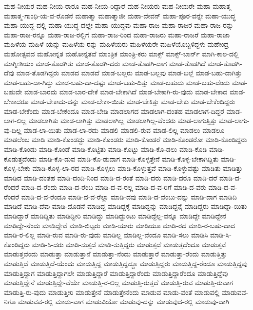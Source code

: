 {ಮಹ-ನೀಯರ
ಮಹ-ನೀಯ-ರಾರೂ
ಮಹ-ನೀಯ-ರಿದ್ದಾರೆ
ಮಹ-ನೀಯರು
ಮಹ-ನೀಯರೇ
ಮಹಾ
ಮಹಾತ್ಮ
ಮಹಾತ್ಮ-ಗಾಂಧಿ-ಯ-ವ-ರೊಡನೆ
ಮಹಾತ್ಮಾ
ಮಹಾತ್ಮಾಜೀ
ಮಹಾ-ದೇವನ್
ಮಹಾ-ಪೂರ-ವನ್ನೇ
ಮಹಾ-ಯುದ್ಧ
ಮಹಾ-ಯುದ್ಧ-ದಲ್ಲಿ
ಮಹಾ-ಯುದ್ಧ-ದಲ್ಲೇ
ಮಹಾ-ಯುದ್ಧವು
ಮಹಾ-ರಾಜ
ಮಹಾ-ರಾಜರ
ಮಹಾ-ರಾಜ-ರನ್ನು
ಮಹಾ-ರಾಜ-ರನ್ನೂ
ಮಹಾ-ರಾಜ-ರಲ್ಲಿಗೆ
ಮಹಾ-ರಾಜ-ರಿಂದ
ಮಹಾ-ರಾಜರು
ಮಹಾ-ರಾಜರೆ
ಮಹಾ-ರಾಜಾ
ಮಹಿಳೆಯ
ಮಹಿಳೆ-ಯನ್ನು
ಮಹಿಳೆಯ-ರನ್ನು
ಮಹಿಳೆಯರು
ಮಹಿಳೆಯರೇ
ಮಹಿಳೆಯೊಬ್ಬಳಿದ್ದಳು
ಮಹೇಂದ್ರ
ಮಹೋತ್ಸವದ
ಮಹೋನ್ನತ
ಮಹೋನ್ನತವೆ
ಮಾಂತ್ರಿಕ
ಮಾಂತ್ರಿ-ಕರು
ಮಾಕ್ಸ್
ಮಾಕ್ಸ್-ಬಾರ್ನ್
ಮಾಗಿ-ಕಾಲ-ದಲ್ಲಿ
ಮಾಗ್ನೀಶಿಯಂ
ಮಾಡ-ತೊಡಗಿತು
ಮಾಡ-ತೊಡಗಿ-ದರು
ಮಾಡ-ತೊಡಗಿ-ದಾಗ
ಮಾಡ-ತೊಡಗಿದೆ
ಮಾಡ-ತೊಡಗಿ-ದೆವು
ಮಾಡ-ತೊಡಗಿದ್ದರು
ಮಾಡದ
ಮಾಡದೆ
ಮಾಡ-ಬಲ್ಲರು
ಮಾಡ-ಬಲ್ಲವು
ಮಾಡ-ಬಲ್ಲೆ
ಮಾಡ-ಬಹು-ದಾಗಿತ್ತು
ಮಾಡ-ಬಹು-ದಾ-ಗಿದ್ದು
ಮಾಡ-ಬಹು-ದಾ-ದಷ್ಟು
ಮಾಡ-ಬಹು-ದಿತ್ತು
ಮಾಡ-ಬಹುದು
ಮಾಡ-ಬಹು-ದೆಂದು
ಮಾಡ-ಬಹುದೇ
ಮಾಡ-ಬಾರದು
ಮಾಡ-ಬಾರ-ದೇಕೆ
ಮಾಡ-ಬೇಕಾಗಿದೆ
ಮಾಡ-ಬೇಕಾಗಿ-ರು-ವುದು
ಮಾಡ-ಬೇಕಾದ
ಮಾಡ-ಬೇಕಾದರೂ
ಮಾಡ-ಬೇಕಾದು-ದನ್ನು
ಮಾಡ-ಬೇಕಾ-ಯಿತು
ಮಾಡ-ಬೇಕಿತ್ತು
ಮಾಡ-ಬೇಕು
ಮಾಡ-ಬೇಕೆಂದಿದ್ದರು
ಮಾಡ-ಬೇಕೆಂದು
ಮಾಡ-ಬೇಕೆಂದೂ
ಮಾಡ-ಬೇಡಿ
ಮಾಡಲಾಗದ
ಮಾಡಲಾಗ-ದಂತಹ
ಮಾಡಲಾಗ-ದಿದ್ದರೆ
ಮಾಡ-ಲಾಗ-ಲಿಲ್ಲ
ಮಾಡಲಾಗಿತು
ಮಾಡ-ಲಾಗಿತ್ತು
ಮಾಡಲಾಗಿಲ್ಲ
ಮಾಡಲಾಗಿಲ್ಲ-ವೆಂದರು
ಮಾಡ-ಲಾಗುತ್ತಿತ್ತು
ಮಾಡ-ಲಾಗು-ವು-ದಿಲ್ಲ
ಮಾಡ-ಲಾ-ಯಿತು
ಮಾಡ-ಲಾ-ರದು
ಮಾಡಲಿ
ಮಾಡಲಿ-ರುವ
ಮಾಡ-ಲಿಲ್ಲ
ಮಾಡಲು
ಮಾಡಲೂ
ಮಾಡಲೆಂಬ
ಮಾಡಿ
ಮಾಡಿ-ಕೊಂಡದ್ದು
ಮಾಡಿ-ಕೊಂಡರು
ಮಾಡಿ-ಕೊಂಡರೆ
ಮಾಡಿ-ಕೊಂಡರೋ
ಮಾಡಿ-ಕೊಂಡಿದ್ದರು
ಮಾಡಿ-ಕೊಂಡು
ಮಾಡಿ-ಕೊಂಡೆ
ಮಾಡಿ-ಕೊಟ್ಟಿತು
ಮಾಡಿ-ಕೊಟ್ಟು
ಮಾಡಿ-ಕೊ-ಡಲು
ಮಾಡಿ-ಕೊಡಿ
ಮಾಡಿ-ಕೊಡುತ್ತದೆಂದು
ಮಾಡಿ-ಕೊ-ಡುವ
ಮಾಡಿ-ಕೊ-ಡುವಾಗ
ಮಾಡಿ-ಕೊಳ್ಳತ್ತೇನೆ
ಮಾಡಿ-ಕೊಳ್ಳ-ಬೇಕಾಗಿದ್ದಿತು
ಮಾಡಿ-ಕೊಳ್ಳ-ಬೇಕು
ಮಾಡಿ-ಕೊಳ್ಳ-ಲಾ-ರದ
ಮಾಡಿ-ಕೊಳ್ಳಲು
ಮಾಡಿ-ಕೊಳ್ಳುತ್ತವೆ
ಮಾಡಿ-ಕೊಳ್ಳುವಷ್ಟು
ಮಾಡಿತು
ಮಾಡಿತ್ತು
ಮಾಡಿದ
ಮಾಡಿ-ದಂತಹ
ಮಾಡಿ-ದಂದಿ-ನಿಂದ
ಮಾಡಿ-ದ-ರಂತೆ
ಮಾಡಿ-ದರು
ಮಾಡಿ-ದರೂ
ಮಾಡಿ-ದರೆ
ಮಾಡಿ-ದ-ರೆಂದರೆ
ಮಾಡಿ-ದ-ರೆಂದು
ಮಾಡಿ-ದ-ರೆಂಬ
ಮಾಡಿ-ದ-ವ-ರಲ್ಲ
ಮಾಡಿ-ದ-ವ-ರಿಗೆ
ಮಾಡಿ-ದ-ವರು
ಮಾಡಿ-ದ-ವ-ರೆಂದರೆ
ಮಾಡಿ-ದ-ವ-ರೆಂದೂ
ಮಾಡಿ-ದ-ವ-ರೆಲ್ಲಾ
ಮಾಡಿ-ದವು
ಮಾಡಿ-ದ-ವೆಂಬು-ದನ್ನು
ಮಾಡಿ-ದಾಗ
ಮಾಡಿದಿ
ಮಾಡಿದೆ
ಮಾಡಿ-ದೆವು
ಮಾಡಿ-ದೊಡನೆ
ಮಾಡಿದ್ದ
ಮಾಡಿದ್ದಕ್ಕೆ
ಮಾಡಿದ್ದನ್ನು
ಮಾಡಿದ್ದನ್ನೆ
ಮಾಡಿದ್ದರು
ಮಾಡಿದ್ದಾ-ಯಿತು
ಮಾಡಿದ್ದಾರೆ
ಮಾಡಿದ್ದಿತು
ಮಾಡಿದ್ದೀರಿ
ಮಾಡಿದ್ದು
ಮಾಡಿದ್ದುಂಟು
ಮಾಡಿದ್ದೆಲ್ಲ-ವನ್ನೂ
ಮಾಡಿದ್ದೇ
ಮಾಡಿದ್ದೇನೆ
ಮಾಡಿದ್ದೇ-ನೆಂದು
ಮಾಡಿದ್ದೇವೆ
ಮಾಡಿ-ಬಿಟ್ಟರು
ಮಾಡಿ-ಯಾರು
ಮಾಡಿಯೂ
ಮಾಡಿ-ರದ
ಮಾಡಿ-ರ-ಬಹು-ದಾದ
ಮಾಡಿ-ರ-ಲಿಲ್ಲ
ಮಾಡಿ-ರುವ
ಮಾಡಿ-ರು-ವುದು
ಮಾಡಿಲ್ಲ
ಮಾಡಿಲ್ಲ-ವೆಂದೂ
ಮಾಡಿ-ಸಲು
ಮಾಡಿಸಿ
ಮಾಡಿ-ಸಿ-ಕೊಂಡಿದ್ದರು
ಮಾಡಿ-ಸಿ-ದರು
ಮಾಡಿ-ಸುತ್ತದೆ
ಮಾಡಿ-ಸುತ್ತಿದ್ದರು
ಮಾಡುತ್ತದೆ
ಮಾಡುತ್ತದೆಂದೂ
ಮಾಡುತ್ತವೆ
ಮಾಡುತ್ತವೆಂದು
ಮಾಡುತ್ತಾ
ಮಾಡುತ್ತಾನೆ
ಮಾಡುತ್ತಾ-ನೆಂದು
ಮಾಡುತ್ತಾರೆ
ಮಾಡುತ್ತಾ-ರೆಂದು
ಮಾಡುತ್ತಿತ್ತು
ಮಾಡುತ್ತಿದೆ
ಮಾಡುತ್ತಿದೆ-ಯೆಂದು
ಮಾಡುತ್ತಿದ್ದ
ಮಾಡುತ್ತಿದ್ದದ್ದೂ
ಮಾಡುತ್ತಿದ್ದರು
ಮಾಡುತ್ತಿದ್ದ-ರೆಂದೂ
ಮಾಡುತ್ತಿದ್ದವು
ಮಾಡುತ್ತಿದ್ದಾಗ
ಮಾಡುತ್ತಿದ್ದಾಗಲೇ
ಮಾಡುತ್ತಿದ್ದಾರೆ
ಮಾಡುತ್ತಿದ್ದಾರೆಂದು
ಮಾಡುತ್ತಿದ್ದಾರೆಂದೂ
ಮಾಡುತ್ತಿದ್ದೆವು
ಮಾಡುತ್ತಿದ್ದೇನೆ
ಮಾಡುತ್ತಿದ್ದೇ-ವೆಯೇ
ಮಾಡುತ್ತಿ-ರ-ಲಿಲ್ಲ
ಮಾಡುತ್ತಿ-ರುತ್ತದೆ
ಮಾಡುತ್ತಿ-ರುವ
ಮಾಡುತ್ತಿ-ರುವಾಗ
ಮಾಡುತ್ತಿ-ರು-ವುದು
ಮಾಡುತ್ತೀರಿ
ಮಾಡುತ್ತೇನೆ
ಮಾಡುತ್ತೇನೆಂದು
ಮಾಡುವ
ಮಾಡು-ವಂತೆ
ಮಾಡುವಲ್ಲಿ
ಮಾಡುವವ-ನಿಗೂ
ಮಾಡುವವ-ರಲ್ಲಿ
ಮಾಡು-ವಾಗ
ಮಾಡುವಿಯೋ
ಮಾಡುವು-ದನ್ನು
ಮಾಡುವುದ-ರಲ್ಲಿ
ಮಾಡುವು-ದಾಗಿ
}
